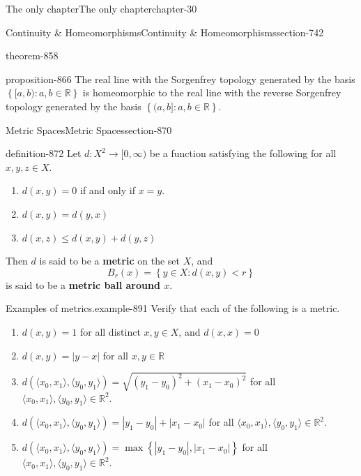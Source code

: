 \documentclass[oneside,10pt,]{book}
\newcommand{\terminology}[1]{\textbf{#1}}
\newcommand{\tuple}[1]{\langle #1 \rangle}
\newcommand{\mb}{\mathbb}
\newcommand{\setBuilder}[2]{\left\{#1:#2\right\}}
\newcommand{\setList}[1]{\left\{#1\right\}}
\newcommand{\lt}{<}
\begin{document}
\begin{chapterptx}{The only chapter}{}{The only chapter}{}{}{chapter-30}
\begin{sectionptx}{Continuity \& Homeomorphisms}{}{Continuity \& Homeomorphisms}{}{}{section-742}
\begin{theorem}{}{}{theorem-858}
\end{theorem}
\begin{proposition}{}{}{proposition-866}%
\hypertarget{p-867}{}%
The real line with the Sorgenfrey topology generated by the basis \(\setBuilder{[a,b)}{a,b\in\mb R}\) is homeomorphic to the real line with the reverse Sorgenfrey topology generated by the basis \(\setBuilder{(a,b]}{a,b\in\mb R}\).%
\end{proposition}
\end{sectionptx}
%
%
\typeout{************************************************}
\typeout{************************************************}
%
\begin{sectionptx}{Metric Spaces}{}{Metric Spaces}{}{}{section-870}
\begin{definition}{}{definition-872}%
\hypertarget{p-873}{}%
Let \(d:X^2\to[0,\infty)\) be a function satisfying the following for all \(x,y,z\in X\).%
\leavevmode%
\begin{enumerate}
\item\hypertarget{li-877}{}\(d(x,y)=0\) if and only if \(x=y\).%
\item\hypertarget{li-880}{}\(d(x,y)=d(y,x)\)%
\item\hypertarget{li-882}{}\(d(x,z)\leq d(x,y)+d(y,z)\)%
\end{enumerate}
\hypertarget{p-884}{}%
Then \(d\) is said to be a \terminology{metric} on the set \(X\), and%
\begin{equation*}
B_r(x)=\setBuilder{y\in X}{d(x,y)\lt r}
\end{equation*}
is said to be a \terminology{metric ball around \(x\)}.%
\end{definition}
\begin{example}{Examples of metrics.}{example-891}%
\hypertarget{p-893}{}%
Verify that each of the following is a metric.%
\leavevmode%
\begin{enumerate}
\item\hypertarget{li-895}{}\(d(x,y)=1\) for all distinct \(x,y\in X\), and \(d(x,x)=0\)%
\item\hypertarget{li-899}{}\(d(x,y)=|y-x|\) for all \(x,y\in\mb R\)%
\item\hypertarget{li-902}{}\(d(\tuple{x_0,x_1},\tuple{y_0,y_1})=\sqrt{(y_1-y_0)^2+(x_1-x_0)^2}\) for all \(\tuple{x_0,x_1},\tuple{y_0,y_1}\in\mb R^2\).%
\item\hypertarget{li-905}{}\(d(\tuple{x_0,x_1},\tuple{y_0,y_1})=|y_1-y_0|+|x_1-x_0|\) for all \(\tuple{x_0,x_1},\tuple{y_0,y_1}\in\mb R^2\).%
\item\hypertarget{li-908}{}\(d(\tuple{x_0,x_1},\tuple{y_0,y_1})=\max\setList{|y_1-y_0|,|x_1-x_0|}\) for all \(\tuple{x_0,x_1},\tuple{y_0,y_1}\in\mb R^2\).%

\end{enumerate}
\end{example}
\end{sectionptx}
\end{chapterptx}
\end{document}
